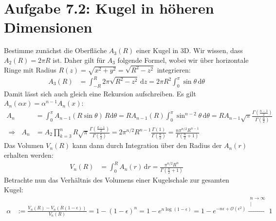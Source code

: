 \documentclass[a4paper,12pt]{article}
\newcommand{\kom}{}
\newcommand{\intx}{}
\newcommand{\kla}{}
\begin{document}
\section*{Aufgabe 7.2: Kugel in höheren Dimensionen}
Bestimme zunächst die Oberfläche $A_3(R)$ einer Kugel in 3D. Wir wissen, dass $A_2(R)=2\pi R$ ist. Daher gilt für $A_3$ folgende Formel, wobei wir über horizontale Ringe mit Radius $R(z)=\sqrt{x^2+y^2}=\sqrt{R^2-z^2}$ integrieren:
\begin{align*}
A_3(R)&=\intx\int_{-R}^{R}2\pi \sqrt{R^2-z^2}\,\mathrm{d}z=2\pi R^2\intx\int_{0}^{\pi}\sin\theta\,\mathrm{d}\theta
\end{align*}
Damit lässt sich auch gleich eine Rekursion aufschreiben. Es gilt $A_n(\alpha x)=\alpha^{n-1}A_n(x)$:
\begin{align*}
A_n&=\intx\int_{0}^{\pi}A_{n-1}(R\sin\theta)\,R\mathrm{d}\theta=RA_{n-1}(R)\intx\int_{0}^{\pi}\sin^{n-2}\theta\,\mathrm{d}\theta=RA_{n-1}\sqrt{\pi}\frac{\Gamma\kla\left( {\frac{n-1}{2}} \right)}{\Gamma\kla\left( {\frac{n}{2}} \right)}\\
\Rightarrow\ \ \ A_n&=A_2\prod_{k=3}^nR\sqrt{\pi}\frac{\Gamma\kla\left( {\frac{k-1}{2}} \right)}{\Gamma\kla\left( {\frac{k}{2}} \right)}=2\pi^{n/2}R^{n-1}\frac{\Gamma(1)}{\Gamma\kla\left( {\frac{n}{2}} \right)}=\frac{n\pi^{n/2}R^{n-1}}{\Gamma\kla\left( {\frac{n}{2}+1} \right)}
\end{align*}
Das Volumen $V_n(R)$ kann dann durch Integration über den Radius der $A_n(r)$ erhalten werden:
\begin{align*}
V_n(R)&=\intx\int_{0}^{R}A_n(r)\,\mathrm{d}r=\frac{\pi^{n/2}R^n}{\Gamma\kla\left( {\frac{n}{2}+1} \right)}
\end{align*}
Betrachte nun das Verhältnis des Volumens einer Kugelschale zur gesamten Kugel:
\begin{align*}
\alpha&:=\frac{V_n(R)-V_n(R(1-\epsilon))}{V_n(R)}=1-\kla\left( {1-\epsilon} \right)^n=1-e^{n\log(1-\epsilon)}=1-e^{-n\epsilon +\mathcal{O}(\epsilon^2)}\kom\overset{\substack{{n\rightarrow\infty} \\ |}}{\longrightarrow}1
\end{align*}
\end{document}
